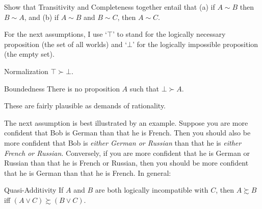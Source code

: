 \begin{exercise3}
  Show that Transitivity and Completeness together entail that (a) if
  $A \sim B$ then $B \sim A$, and (b) if $A \sim B$ and $B \sim C$,
  then $A \sim C$.
\end{exercise3}


For the next assumptions, I use `$\top$' to stand for the logically
necessary proposition (the set of all worlds) and `$\bot$' for the
logically impossible proposition (the empty set).
%
\begin{genericthm}{Normalization}
  $\top \succ \bot$.
\end{genericthm}
\vspace{-2mm}
\begin{genericthm}{Boundedness}
  There is no proposition $A$ such that $\bot \succ A$.
\end{genericthm}
These are fairly plausible as demands of rationality. 

The next assumption is best illustrated by an example. Suppose you are
more confident that Bob is German than that he is French.  Then you
should also be more confident that Bob is \emph{either German or
  Russian} than that he is \emph{either French or
  Russian}. Conversely, if you are more confident that he is German or
Russian than that he is French or Russian, then you should be more
confident that he is German than that he is French. In general:

\begin{genericthm}{Quasi-Additivity}
  If $A$ and $B$ are both logically incompatible with $C$, then $A
  \succsim B$ iff $(A \lor C) \succsim (B \lor C)$.
\end{genericthm}

